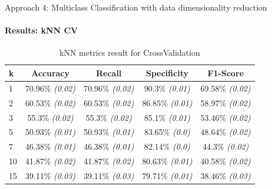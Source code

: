 \documentclass[9pt, pstricks, xcolor=dvipsnames]{beamer}
\begin{document}
\begin{frame}{Approach 4: Multiclass Classification with data dimensionality reduction}
\framesubtitle{Results: kNN CV}
\begin{table}[H]
\centering
\begin{tabular}{lcccc}
\toprule
k & Accuracy & Recall & Specificity & F1-Score \\
\midrule
1 & 70.96\% \textit{(0.02)} & 70.96\% \textit{(0.02)} & 90.3\% \textit{(0.01)} & 69.58\% \textit{(0.02)} \\
2 & 60.53\% \textit{(0.02)} & 60.53\% \textit{(0.02)} & 86.85\% \textit{(0.01)} & 58.97\% \textit{(0.02)} \\
3 & 55.3\% \textit{(0.02)} & 55.3\% \textit{(0.02)} & 85.1\% \textit{(0.01)} & 53.46\% \textit{(0.02)} \\
5 & 50.93\% \textit{(0.01)} & 50.93\% \textit{(0.01)} & 83.65\% \textit{(0.0)} & 48.64\% \textit{(0.02)} \\
7 & 46.38\% \textit{(0.01)} & 46.38\% \textit{(0.01)} & 82.14\% \textit{(0.0)} & 44.3\% \textit{(0.02)} \\
10 & 41.87\% \textit{(0.02)} & 41.87\% \textit{(0.02)} & 80.63\% \textit{(0.01)} & 40.58\% \textit{(0.02)} \\
15 & 39.11\% \textit{(0.03)} & 39.11\% \textit{(0.03)} & 79.71\% \textit{(0.01)} & 38.46\% \textit{(0.03)} \\
\bottomrule
\end{tabular}
\caption{kNN metrics result for CrossValidation}
\label{tab:kNN_CV_approach4}
\end{table}
\end{frame}
\end{document}
